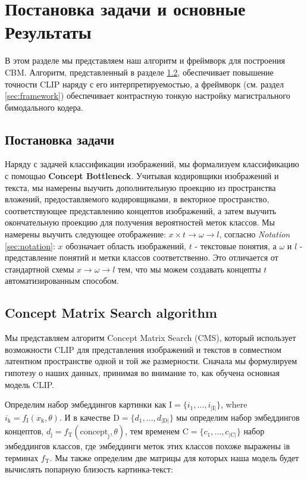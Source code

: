 \section{Постановка задачи и основные Результаты}
\label{sec:probl}

В этом разделе мы представляем наш алгоритм и фреймворк для построения CBM. Алгоритм, представленный в разделе \ref{sec:cms}, обеспечивает повышение точности CLIP наряду с его интерпретируемостью, а фреймворк (см. раздел \ref{sec:framework}) обеспечивает контрастную тонкую настройку магистрального бимодального кодера.

\subsection{Постановка задачи}

Наряду с задачей классификации изображений, мы формализуем классификацию с помощью \textbf{Concept Bottleneck}. Учитывая кодировщики изображений и текста, мы намерены выучить дополнительную проекцию из пространства вложений, предоставляемого кодировщиками, в векторное пространство, соответствующее представлению концептов изображений, а затем выучить окончательную проекцию для получения вероятностей меток классов. Мы намерены выучить следующее отображение: $x\times t \to \omega \to l$, согласно \textit{Notation} \ref{sec:notation}: $x$ обозначает область изображений, $t$ - текстовые понятия, а $\omega$ и $l$ - представление понятий и метки классов соответственно. Это отличается от стандартной схемы $x\to \omega\to l$ тем, что мы можем создавать концепты $t$ автоматизированным способом.

\subsection{Concept Matrix Search algorithm}\label{sec:cms}

Мы представляем алгоритм Concept Matrix Search (CMS), который использует возможности CLIP для представления изображений и текстов в совместном латентном пространстве одной и той же размерности. Сначала мы формулируем гипотезу о наших данных, принимая во внимание то, как обучена основная модель CLIP.

Определим набор эмбеддингов картинки как $\mathrm{I} = \{i_1, \dots, i_{|\mathrm{I}|}\}$, where $i_{\mathrm{k}} = f_{\mathrm{I}}(x_{\mathrm{k}}, \theta)$. И в качестве $\mathrm{D} = \{d_1, \dots, d_{|\mathrm{D}|}\}$ мы определим набор эмбеддингов концептов, $d_\mathrm{j} = f_{\mathrm{T}}(\mathrm{concept}_{\mathrm{j}}, \theta)$, тем временем $\mathrm{C} = \{c_1, \dots, c_{|\mathrm{C}|}\}$ набор эмбеддингов классов, где эмбеддинги меток этих классов похоже выражены iв терминах $f_{\mathrm{T}}$. Мы также определим две матрицы для которых наша модель будет вычислять попарную близость картинка-текст:

